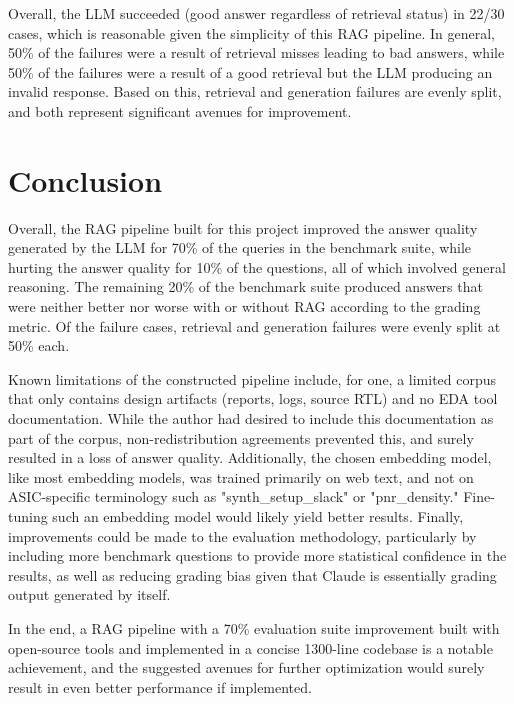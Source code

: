 \documentclass[conference]{IEEEtran}
\begin{document}
Overall, the LLM succeeded (good answer regardless of retrieval status) in 22/30 cases, which is reasonable given the simplicity of this RAG pipeline. In general, 50\% of the failures were a result of retrieval misses leading to bad answers, while 50\% of the failures were a result of a good retrieval but the LLM producing an invalid response. Based on this, retrieval and generation failures are evenly split, and both represent significant avenues for improvement.

\section{Conclusion}

Overall, the RAG pipeline built for this project improved the answer quality generated by the LLM for 70\% of the queries in the benchmark suite, while hurting the answer quality for 10\% of the questions, all of which involved general reasoning. The remaining 20\% of the benchmark suite produced answers that were neither better nor worse with or without RAG according to the grading metric. Of the failure cases, retrieval and generation failures were evenly split at 50\% each.

Known limitations of the constructed pipeline include, for one, a limited corpus that only contains design artifacts (reports, logs, source RTL) and no EDA tool documentation. While the author had desired to include this documentation as part of the corpus, non-redistribution agreements prevented this, and surely resulted in a loss of answer quality. Additionally, the chosen embedding model, like most embedding models, was trained primarily on web text, and not on ASIC-specific terminology such as "synth\_setup\_slack" or "pnr\_density." Fine-tuning such an embedding model would likely yield better results. Finally, improvements could be made to the evaluation methodology, particularly by including more benchmark questions to provide more statistical confidence in the results, as well as reducing grading bias given that Claude is essentially grading output generated by itself.

In the end, a RAG pipeline with a 70\% evaluation suite improvement built with open-source tools and implemented in a concise 1300-line codebase is a notable achievement, and the suggested avenues for further optimization would surely result in even better performance if implemented.
\end{document}

